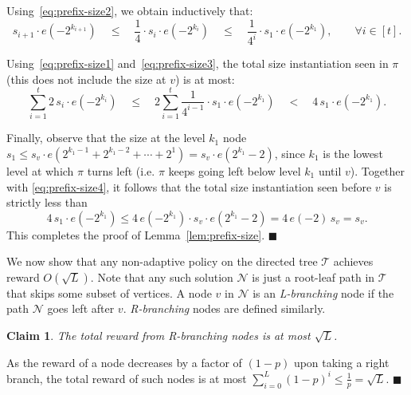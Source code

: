 \documentclass[11pt,letterpaper]{article}
\newtheorem{claim}[theorem]{Claim}
\numberwithin{algorithm}{section}
\newenvironment{proof}{

\noindent{\bf Proof:}}
{\hfill$\blacksquare$


}
\newcommand{\N}[0]{{\ensuremath{\mathcal{N}}}\xspace}
\newcommand{\T}{\ensuremath{\mathcal{T}}\xspace}
\newcommand{\q}[1]{e\left(#1\right)}
\begin{document}
\begin{proof}
Using~\eqref{eq:prefix-size2}, we obtain inductively that:
\begin{equation}\label{eq:prefix-size3}
s_{i+1}\cdot \q{-2^{k_{i+1}}} \quad \le \quad \frac14\cdot s_i\cdot \q{-2^{k_i}} \quad \le \quad \frac{1}{4^{i}} \cdot s_1\cdot \q{-2^{k_1}},\qquad \forall i\in[t].
\end{equation}


Using~\eqref{eq:prefix-size1} and~\eqref{eq:prefix-size3}, the total size instantiation seen in $\pi$ (this does not include the size at $v$) is at most:
\begin{equation}\label{eq:prefix-size4}
\sum_{i=1}^t 2\,s_i\cdot \q{-2^{k_i}} \quad \le \quad
2\sum_{i=1}^t \frac{1}{4^{i-1}} \cdot s_1\cdot \q{-2^{k_1}} \quad < \quad 4\,s_1\cdot \q{-2^{k_1}}.
\end{equation}

Finally, observe that the size at the level $k_1$ node $s_1\le s_v\cdot \q{2^{k_1-1}+2^{k_1-2}+\cdots+2^1}=s_v\cdot \q{2^{k_1}-2}$, since $k_1$ is the lowest level at which $\pi$ turns left (i.e. $\pi$ keeps going left below level $k_1$ until $v$). Together with \eqref{eq:prefix-size4}, it follows that the total size instantiation seen before $v$ is strictly less than
$$4 \,s_1\cdot \q{-2^{k_1}} \leq 4 \, \q{-2^{k_1}} \cdot  s_v\cdot \q{2^{k_1}-2}  = 4 \, \q{-2} \, s_v =  s_v.$$
This completes the proof of Lemma~\ref{lem:prefix-size}. \end{proof}





We now show that any non-adaptive policy on the directed tree \T achieves reward $O(\sqrt{L})$. Note that any such solution \N is just a root-leaf path in \T that skips some subset of vertices. A node $v$ in \N is an {\em L-branching} node if the path \N goes left after $v$. {\em R-branching} nodes are defined similarly.

\begin{claim}\label{cl:na-Rbranch}
The total reward from R-branching nodes is at most $\sqrt{L}$.
\end{claim}
\begin{proof}
As the reward of a node decreases by a factor of $(1-p)$ upon taking a right branch,
the total reward of such nodes is at most $\sum_{i=0}^L (1-p)^i \le \frac{1}{p}=\sqrt{L}$.
\end{proof}
\end{document}
